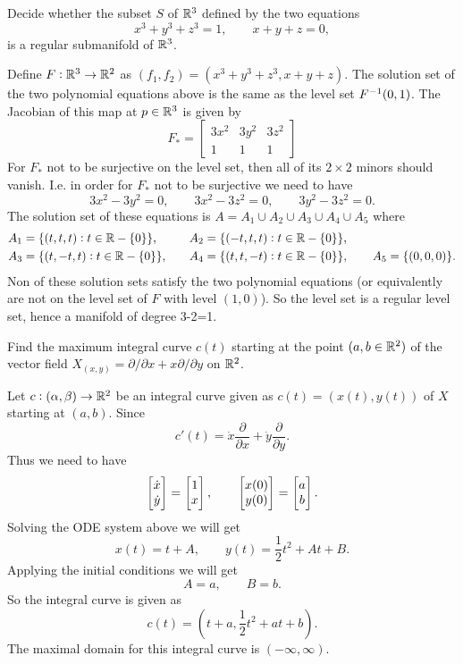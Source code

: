 \begin{problem}
	Decide whether the subset $ S $ of $ \mathbb{R}^3 $ defined by the two equations
	\[ x^3 + y^3 + z^3 = 1, \qquad x+y+z = 0, \]
	is a regular submanifold of $ \mathbb{R}^3 $.
\end{problem}
\begin{solution}
	Define $ F:\mathbb{R}^3 \to \mathbb{R}^2 $ as $ (f_1, f_2) = (x^3+y^3+z^3, x+y+z) $. The solution set of the two polynomial equations above is the same as the level set $ F^{-1}(0,1) $. The Jacobian of this map at $ p \in \mathbb{R}^3 $ is given by
	\[ F_* = \begin{bmatrix}
		3x^2 & 3y^2 & 3z^2 \\
		1 & 1 & 1
	\end{bmatrix} \]
	For $ F_* $ not to be surjective on the level set, then all of its $ 2\times 2 $ minors should vanish. I.e. in order for $ F_* $ not to be surjective we need to have
	\[ 3x^2 - 3y^2 = 0, \qquad 3x^2 - 3z^2 = 0, \qquad 3y^2 - 3z^2 = 0. \]
	The solution set of these equations is $ A = A_1 \cup A_2 \cup A_3 \cup A_4 \cup A_5 $ where
	\begin{align*}
		&A_1 = \{(t,t,t): t\in \mathbb{R}-\{0\}\},\quad &&A_2 = \{(-t,t,t): t\in \mathbb{R}-\{0\}\},\\
		&A_3 = \{(t,-t,t): t\in \mathbb{R}-\{0\}\},\quad &&A_4 = \{(t,t,-t): t\in \mathbb{R}-\{0\}\},\qquad A_5=\{(0,0,0)\}.
	\end{align*}
	Non of these solution sets satisfy the two polynomial equations (or equivalently are not on the level set of $ F $ with level $ (1,0) $). So the level set is a regular level set, hence a manifold of degree 3-2=1. 
\end{solution}


\begin{problem}
	Find the maximum integral curve $ c(t) $ starting at the point $ (a,b \in \mathbb{R}^2) $ of the vector field $ X_{(x,y)} = \partial/\partial x + x \partial/\partial y $ on $ \mathbb{R}^2 $.
\end{problem}
\begin{solution}
	Let $ c:(\alpha,\beta) \to \mathbb{R}^2 $ be an integral curve given as $ c(t) = (x(t),y(t)) $ of $ X $ starting at $ (a,b) $. Since
	\[ c'(t) = \dot{x}\frac{\partial }{\partial x} + \dot{y} \frac{\partial }{\partial y}. \]
	Thus we need to have
	\[ \begin{bmatrix} \dot{x} \\ \dot{y} \end{bmatrix} = \begin{bmatrix} 1 \\ x \end{bmatrix},\qquad \begin{bmatrix} x(0) \\ y(0) \end{bmatrix} = \begin{bmatrix} a \\ b \end{bmatrix}. \]
	Solving the ODE system above we will get
	\[ x(t) = t + A, \qquad y(t) = \frac12 t^2 + A t + B. \]
	Applying the initial conditions we will get
	\[ A = a,\qquad B = b. \]
	So the integral curve is given as
	\[ c(t) = (t+a, \frac12 t^2 + at + b). \]
	The maximal domain for this integral curve is $ (-\infty,\infty) $.
\end{solution}

